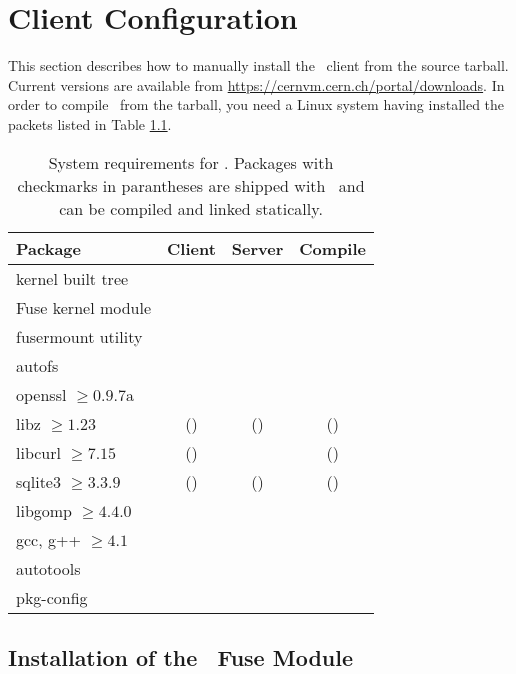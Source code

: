 \chapter{Client Configuration}
\label{sct:install}
This section describes how to manually install the \cvmfs\ client from the source tarball.
Current versions are available from \url{https://cernvm.cern.ch/portal/downloads}.
In order to compile \cvmfs\ from the tarball, you need a Linux system having installed the packets listed in Table \ref{tab:requirements}.
\begin{table}
	\begin{center}
		\begin{tabular}{l|ccc}
			\centering\bf Package & \bf Client & \bf Server & \bf Compile \\\hline
			kernel built tree & & & \checkmark \\
			Fuse kernel module & \checkmark & & \checkmark\\
			fusermount utility & \checkmark & & \\
			autofs & \checkmark & & \\
			openssl $\geq 0.9.7\text{a}$ & \checkmark & \checkmark & \checkmark\\
			libz $\geq 1.23$ & (\checkmark) & (\checkmark) & (\checkmark)\\
			libcurl $\geq 7.15$ & (\checkmark) & & (\checkmark)\\
			sqlite3 $\geq 3.3.9$ & (\checkmark) & (\checkmark) & (\checkmark)\\
			libgomp $\geq 4.4.0$ & & \checkmark & \checkmark \\
			gcc, g++ $\geq 4.1$ &  & & \checkmark\\
			autotools & & & \checkmark\\
			pkg-config & & & \checkmark\\
		\end{tabular}
	\end{center}
	\caption{System requirements for \cvmfs. Packages with checkmarks in parantheses are shipped with \cvmfs\ and can be compiled and linked statically.}
	\label{tab:requirements}
\end{table}

\section{Installation of the \cvmfs\ Fuse Module}

